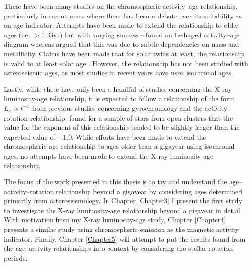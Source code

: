 There have been many studies on the chromospheric activity--age relationship, particularly in recent years where there has been a debate over its suitability as an age indicator. Attempts have been made to extend the relationship to older ages (i.e. $> 1$~Gyr) but with varying success -- \citet{Pace_2013} found an L-shaped activity--age diagram whereas \citet{Lorenzo_Oliveira_etal_2016} argued that this was due to subtle dependencies on mass and metallicity. Claims have been made that for solar twins at least, the relationship is valid to at least solar age \citep{Lorenzo_Oliveira_etal_2018}. However, the relationship has not been studied with asteroseismic ages, as most studies in recent years have used isochronal ages.

Lastly, while there have only been a handful of studies concerning the X-ray luminosity-age relationship, it is expected to follow a relationship of the form $L_{x} \propto t^{-1}$ from previous studies concerning gyrochronology and the activity--rotation relationship. \citet{Jackson_etal_2012} found for a sample of stars from open clusters that the value for the exponent of this relationship tended to be slightly larger than the expected value of $-1.0$. While efforts have been made to extend the chromospheric-age relationship to ages older than a gigayear using isochronal ages, no attempts have been made to extend the X-ray luminosity-age relationship.

The focus of the work presented in this thesis is to try and understand the age--activity--rotation relationship beyond a gigayear by considering ages determined primarily from asteroseismology. In Chapter \ref{Chapter3} I present the first study to investigate the X-ray luminosity-age relationship beyond a gigayear in detail. With motivation from my X-ray luminosity-age study, Chapter \ref{Chapter4} presents a similar study using chromospheric emission as the magnetic activity indicator. Finally, Chapter \ref{Chapter5} will attempt to put the results found from the age--activity relationships into context by considering the stellar rotation periods.